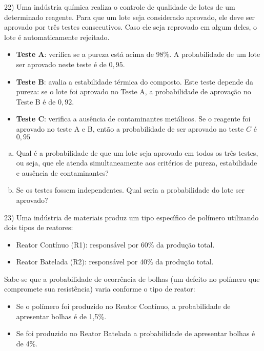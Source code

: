 \documentclass{article}
\begin{document}
\vspace{5px}

22) Uma indústria química realiza o controle de qualidade de lotes de um determinado reagente.
 Para que um lote seja considerado aprovado, ele deve ser aprovado por três testes consecutivos. Caso ele seja reprovado em algum deles, o lote é 
 automaticamente rejeitado.

\begin{itemize}
    \item \textbf{Teste A}: verifica se a pureza está acima de 98\%. A probabilidade de um lote ser aprovado neste teste é de $0{,}95$.
    
    \item \textbf{Teste B}: avalia a estabilidade térmica do composto. Este teste depende da pureza: se o lote foi aprovado no Teste A, a probabilidade de aprovação no Teste B é de $0{,}92$.
    
    \item \textbf{Teste C}: verifica a ausência de contaminantes metálicos. Se o reagente foi aprovado no teste A e B, então a probabilidade de ser aprovado no teste $C$ é $0,95$
\end{itemize}
\begin{enumerate}[a)]
    \item Qual é a probabilidade de que um lote seja aprovado em todos os três testes, ou seja, que ele atenda simultaneamente aos critérios de pureza, estabilidade e ausência de contaminantes?
    \item Se os testes fossem independentes. Qual seria a probabilidade do lote ser aprovado?
\end{enumerate}


\vspace{5px}

23) Uma indústria de materiais produz um tipo específico de polímero utilizando dois tipos de reatores:

\begin{itemize}
    \item Reator Contínuo (R1): responsável por 60\% da produção total.
    \item Reator Batelada (R2): responsável por 40\% da produção total.
\end{itemize}

Sabe-se que a probabilidade de ocorrência de bolhas (um defeito no polímero que compromete sua resistência) varia conforme o tipo de reator:

\begin{itemize}
    \item Se o polímero foi produzido no Reator Contínuo, a probabilidade de apresentar bolhas é de 1,5\%.
    \item Se foi produzido no Reator Batelada a probabilidade de apresentar bolhas é de 4\%.
\end{itemize}
\end{document}
